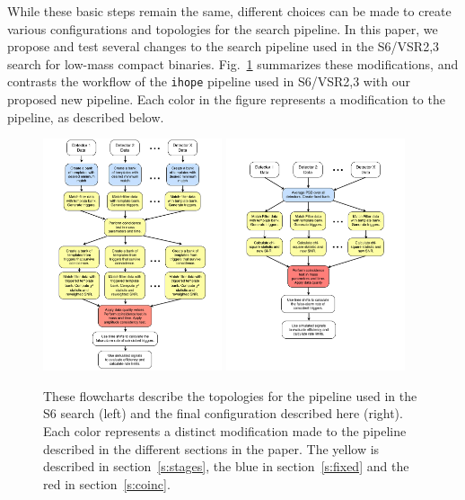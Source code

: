 \documentclass[12pt]{iopart} \usepackage{graphicx,amssymb}
\begin{document}
While these basic steps remain the same, different choices can be made to
create various configurations and topologies for the search pipeline. In this
paper, we propose and test several changes to the search pipeline used in the
S6/VSR2,3 search for low-mass compact binaries.  Fig.~\ref{fig:pipelines}
summarizes these modifications, and contrasts the workflow of the
\texttt{ihope} pipeline used in S6/VSR2,3 with our proposed new pipeline. Each
color in the figure represents a modification to the pipeline, as described
below.
\begin{figure}[tbp]
\begin{center}
\includegraphics[width=0.47\textwidth,trim=68 22 68 15,clip=false]{figures/two_stage_flowchart.pdf}
\hfill
\includegraphics[width=0.47\textwidth,trim=68 -20 68 76,clip=true]{figures/single_stage_flowchart.pdf}
\end{center}
\caption{These flowcharts describe the topologies for the pipeline used in the
S6 search (left) and the final configuration described here (right).  Each
color represents a distinct modification made to the pipeline described in the
different sections in the paper. The yellow is described in
section~\ref{s:stages}, the blue in section~\ref{s:fixed} and the red in
section~\ref{s:coinc}.
\label{fig:pipelines}}
\end{figure}
\end{document}
